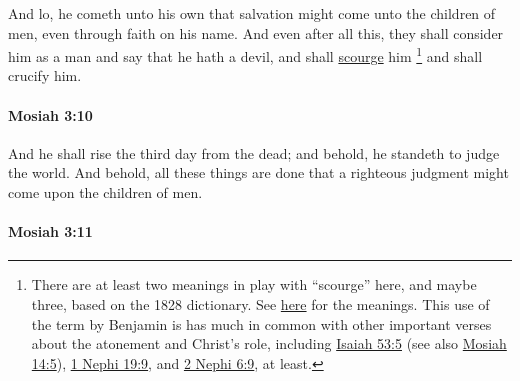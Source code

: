 			And lo, he cometh unto his own
			that salvation might come unto the children of men,
			even through faith on his name.
			And even after all this,
			they shall consider him as a man and say that he hath a devil,
			and shall \hyperref[SCOURGE-1828-transverb]{scourge} him%
				\footnote{%
					\label{MOSIAH-3-9-NOTE-scourge}%
					There are at least two meanings in play with ``scourge'' here, and maybe three, based on the 1828 dictionary. See \hyperref[SCOURGE-1828-transverb]{here} for the meanings. This use of the term by Benjamin is has much in common with other important verses about the atonement and Christ's role, including \hyperref[ISAIAH-53-5]{Isaiah 53:5} (see also \hyperref[MOSIAH-14-5]{Mosiah 14:5}), \hyperref[1NEPHI-19-9]{1 Nephi 19:9}, and \hyperref[2NEPHI-6-9]{2 Nephi 6:9}, at least. 
					}
			and shall crucify him.

		\paragraph{Mosiah 3:10} %
			\label{MOSIAH-3-10}

			And he shall rise the third day from the dead;
			and behold, he standeth to judge the world.
			And behold, all these things are done
			that a righteous judgment might come upon the children of men.

		\paragraph{Mosiah 3:11} %
			\label{MOSIAH-3-11}

